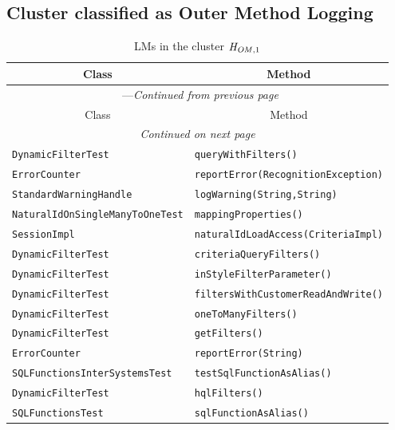 \subsection{Cluster classified as Outer Method Logging}

\begin{center}
\begin{longtable}{ll}
\caption{LMs in the cluster $\mathit{H}_{\mathit{OM},1}$}\\
\toprule\multicolumn{1}{c}{Class}&\multicolumn{1}{c}{Method}\\\midrule
\endfirsthead

\multicolumn{2}{c}{\tablename\ \thetable{}---\textit{Continued from previous page}} \\\midrule
\multicolumn{1}{c}{Class}&\multicolumn{1}{c}{Method}\\\midrule
\endhead
\multicolumn{2}{c}{\textit{Continued on next page}}\\\midrule
\endfoot
\bottomrule
\endlastfoot

\lstinline/DynamicFilterTest/&{\lstinline/queryWithFilters()/}\\
\lstinline/ErrorCounter/&{\lstinline/reportError(RecognitionException)/}\\
\lstinline/StandardWarningHandle/&{\lstinline/logWarning(String,String)/}\\
\lstinline/NaturalIdOnSingleManyToOneTest/&{\lstinline/mappingProperties()/}\\
\lstinline/SessionImpl/&{\lstinline/naturalIdLoadAccess(CriteriaImpl)/}\\
\lstinline/DynamicFilterTest/&{\lstinline/criteriaQueryFilters()/}\\
\lstinline/DynamicFilterTest/&{\lstinline/inStyleFilterParameter()/}\\
\lstinline/DynamicFilterTest/&{\lstinline/filtersWithCustomerReadAndWrite()/}\\
\lstinline/DynamicFilterTest/&{\lstinline/oneToManyFilters()/}\\
\lstinline/DynamicFilterTest/&{\lstinline/getFilters()/}\\
\lstinline/ErrorCounter/&{\lstinline/reportError(String)/}\\
\lstinline/SQLFunctionsInterSystemsTest/&{\lstinline/testSqlFunctionAsAlias()/}\\
\lstinline/DynamicFilterTest/&{\lstinline/hqlFilters()/}\\
\lstinline/SQLFunctionsTest/&{\lstinline/sqlFunctionAsAlias()/}\\
\end{longtable}
\end{center}



